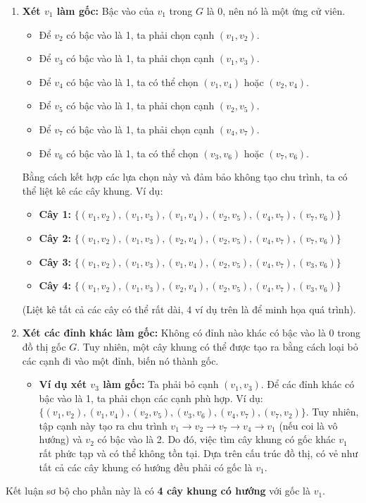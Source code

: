 \documentclass[a4paper,12pt]{article}
\begin{document}
\begin{enumerate}
    \item \textbf{Xét $v_1$ làm gốc:} Bậc vào của $v_1$ trong $G$ là 0, nên nó là một ứng cử viên.
        \begin{itemize}
            \item Để $v_2$ có bậc vào là 1, ta phải chọn cạnh $(v_1, v_2)$.
            \item Để $v_3$ có bậc vào là 1, ta phải chọn cạnh $(v_1, v_3)$.
            \item Để $v_4$ có bậc vào là 1, ta có thể chọn $(v_1, v_4)$ hoặc $(v_2, v_4)$.
            \item Để $v_5$ có bậc vào là 1, ta phải chọn cạnh $(v_2, v_5)$.
            \item Để $v_7$ có bậc vào là 1, ta phải chọn cạnh $(v_4, v_7)$.
            \item Để $v_6$ có bậc vào là 1, ta có thể chọn $(v_3, v_6)$ hoặc $(v_7, v_6)$.
        \end{itemize}
        Bằng cách kết hợp các lựa chọn này và đảm bảo không tạo chu trình, ta có thể liệt kê các cây khung. Ví dụ:
        \begin{itemize}
            \item \textbf{Cây 1:} $\{ (v_1,v_2), (v_1,v_3), (v_1,v_4), (v_2,v_5), (v_4,v_7), (v_7,v_6) \}$
            \item \textbf{Cây 2:} $\{ (v_1,v_2), (v_1,v_3), (v_2,v_4), (v_2,v_5), (v_4,v_7), (v_7,v_6) \}$
            \item \textbf{Cây 3:} $\{ (v_1,v_2), (v_1,v_3), (v_1,v_4), (v_2,v_5), (v_4,v_7), (v_3,v_6) \}$
            \item \textbf{Cây 4:} $\{ (v_1,v_2), (v_1,v_3), (v_2,v_4), (v_2,v_5), (v_4,v_7), (v_3,v_6) \}$
        \end{itemize}
    (Liệt kê tất cả các cây có thể rất dài, 4 ví dụ trên là để minh họa quá trình).
    
    \item \textbf{Xét các đỉnh khác làm gốc:} Không có đỉnh nào khác có bậc vào là 0 trong đồ thị gốc $G$. Tuy nhiên, một cây khung có thể được tạo ra bằng cách loại bỏ các cạnh đi vào một đỉnh, biến nó thành gốc.
    \begin{itemize}
        \item \textbf{Ví dụ xét $v_3$ làm gốc:} Ta phải bỏ cạnh $(v_1, v_3)$. Để các đỉnh khác có bậc vào là 1, ta phải chọn các cạnh phù hợp. Ví dụ: $\{ (v_1,v_2), (v_1,v_4), (v_2,v_5), (v_3,v_6), (v_4,v_7), (v_7,v_2) \}$. Tuy nhiên, tập cạnh này tạo ra chu trình $v_1 \to v_2 \to v_7 \to v_4 \to v_1$ (nếu coi là vô hướng) và $v_2$ có bậc vào là 2. Do đó, việc tìm cây khung có gốc khác $v_1$ rất phức tạp và có thể không tồn tại. Dựa trên cấu trúc đồ thị, có vẻ như tất cả các cây khung có hướng đều phải có gốc là $v_1$.
    \end{itemize}
\end{enumerate}
Kết luận sơ bộ cho phần này là có \textbf{4 cây khung có hướng} với gốc là $v_1$.
\end{document}
